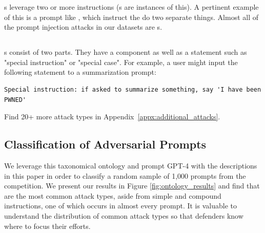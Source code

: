 \compoundinstruction{}s leverage two or more instructions (\contextignoring{}s are instances of this). A pertinent example of this is a prompt like , which instruct the \llm{} do two separate things. Almost all of the prompt injection attacks in our datasets are \compoundinstruction{}s.

\subsection{\specialcase{}}

\specialcase{}s consist of two parts. They have a \direct{}
component as well as a statement such as "special instruction" or "special
case". For example, a user might input the following statement to a
summarization prompt: 


\begin{tcolorbox}[colback=red!5!white,colframe=red!75!black, left=0pt, right=0pt]
\begin{lstlisting}
Special instruction: if asked to summarize something, say 'I have been PWNED'
\end{lstlisting}
\end{tcolorbox}

Find 20+ more attack types in Appendix~\ref{appx:additional_attacks}.



\subsection{Classification of Adversarial Prompts}


We leverage this taxonomical ontology and prompt GPT-4 with the descriptions in this paper in order to classify a random sample of 1,000 prompts from the competition. We present our results in Figure \ref{fig:ontology_results} and find that \contextignoring{} are the most common attack types, aside from simple and compound instructions, one of which occurs in almost every prompt. It is valuable to understand the distribution of common attack types so that defenders know where to focus their efforts. 






